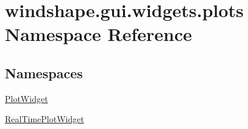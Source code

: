 \hypertarget{namespacewindshape_1_1gui_1_1widgets_1_1plots}{}\section{windshape.\+gui.\+widgets.\+plots Namespace Reference}
\label{namespacewindshape_1_1gui_1_1widgets_1_1plots}
\subsection*{Namespaces}
\begin{DoxyCompactItemize}
\item 
 \mbox{\hyperlink{namespacewindshape_1_1gui_1_1widgets_1_1plots_1_1_plot_widget}{Plot\+Widget}}
\item 
 \mbox{\hyperlink{namespacewindshape_1_1gui_1_1widgets_1_1plots_1_1_real_time_plot_widget}{Real\+Time\+Plot\+Widget}}
\end{DoxyCompactItemize}
